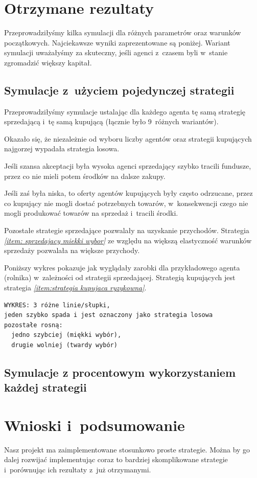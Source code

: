 \documentclass[12pt]{article}
\begin{document}
\section{Otrzymane rezultaty}\label{chapter: rezultaty}
Przeprowadziłyśmy kilka symulacji dla różnych parametrów oraz warunków początkowych. Najciekawsze wyniki zaprezentowane są poniżej. Wariant symulacji uważałyśmy za skuteczny, jeśli agenci z~czasem byli w~stanie zgromadzić
większy kapitał.
\subsection{Symulacje z~użyciem pojedynczej strategii}
Przeprowadziłyśmy symulacje ustalając dla każdego agenta tę samą strategię sprzedającą i~tę samą kupującą (łącznie było 9~różnych wariantów). 

Okazało się, że niezależnie od wyboru liczby agentów oraz strategii kupujących najgorzej wypadała strategia losowa. 

Jeśli szansa akceptacji była wysoka agenci sprzedający szybko tracili fundusze, przez co nie mieli potem
środków na dalsze zakupy. 

Jeśli zaś była niska, to oferty agentów kupujących były często odrzucane, przez co kupujący nie mogli dostać potrzebnych towarów, w~konsekwencji czego nie mogli produkować towarów na sprzedaż i~tracili środki.

Pozostałe strategie sprzedające pozwalały na uzyskanie przychodów. Strategia \emph{\ref{item: sprzedajacy miekki wybor}} ze względu na większą elastyczność warunków sprzedaży pozwalała na większe przychody.

Poniższy wykres pokazuje jak wyglądały zarobki dla przykładowego agenta (rolnika) w~zależności od strategii sprzedającej. Strategią kupujących jest strategia \emph{\ref{item:strategia kupujaca ryzykowna}}.
\begin{verbatim}
WYKRES: 3 różne linie/słupki, 
jeden szybko spada i jest oznaczony jako strategia losowa
pozostałe rosną: 
  jedno szybciej (miękki wybór), 
  drugie wolniej (twardy wybór)
\end{verbatim}

\subsection{Symulacje z procentowym wykorzystaniem każdej strategii}

\section{Wnioski i~podsumowanie}
Nasz projekt ma zaimplementowane stosunkowo proste strategie. Można by go dalej rozwijać implementując coraz to bardziej skomplikowane strategie i~porównując ich rezultaty z~już otrzymanymi.
\end{document}
